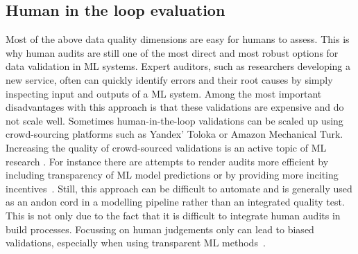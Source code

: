 \subsection{Human in the loop evaluation}

Most of the above data quality dimensions are easy for humans to assess. This is why human audits are still one of the most direct and most robust options for data validation in ML systems. Expert auditors, such as researchers developing a new service, often can quickly identify errors and their root causes by simply inspecting input and outputs of a ML system. Among the most important disadvantages with this approach is that these validations are expensive and do not scale well. Sometimes human-in-the-loop validations can be scaled up using crowd-sourcing platforms such as Yandex' Toloka or Amazon Mechanical Turk. Increasing the quality of crowd-sourced validations is an active topic of ML research \cite{WortmanVaughan2018}. For instance there are attempts to render audits more efficient by including transparency of ML model predictions \cite{schmidt2019quantifying} or by providing more inciting incentives~\cite{Ho_2015, wang_2018}. Still, this approach can be difficult to automate and is generally used as an andon cord in a modelling pipeline rather than an integrated quality test. This is not only due to the fact that it is difficult to integrate human audits in build processes. Focussing on human judgements only can lead to biased validations, especially when using transparent ML methods~\cite{schmidt2020risk}.
